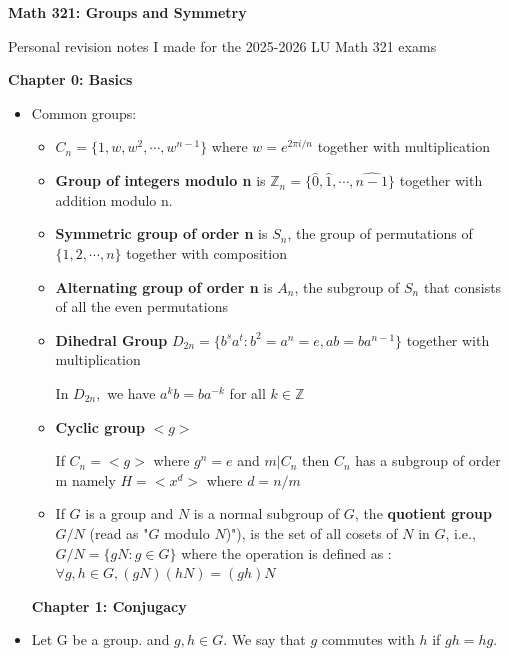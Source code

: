\documentclass[a4paper, 12pt]
{article}
\begin{document}
\textbf{Math 321: Groups and Symmetry}

\hfill

Personal revision notes I made for the 2025-2026 LU Math 321 exams
	
	\hfill
	
\textbf{Chapter 0: Basics}
	\begin{itemize}
		\item Common groups:
		\begin{itemize}
		\item $C_n = \{1,w,w^2, \cdots 
		, w^{n-1}\}$ where $w = e^{2\pi i/n}$ together with multiplication
		
		\item \textbf{Group of integers modulo n} is  $\mathbb{Z}_n = \{\hat{0}, \hat{1}, \cdots, \hat{n-1}\}$ together with addition modulo n.
		
		\item  \textbf{Symmetric group of order n} is $S_n$, the group of permutations of $\{1,2, \cdots, n\}$ together with composition
		
		\item\textbf{ Alternating group of order n} is  $A_n$, the subgroup of $S_n$ that consists of all the even permutations
		
		\item \textbf{Dihedral Group }$D_{2n}= \{b^sa^t: b^2= a^n=e,  ab=ba^{n-1}\}$ together with multiplication
		
		In $D_{2n},$ we have $a^kb= ba^{-k}$ for all $k \in \mathbb{Z}$
		
		\item \textbf{Cyclic group} $<g>$
		
		If $C_n = <g>$ where $g^n = e$ and $m |C_n$ then $C_n$ has a subgroup of order m namely $H= <x^d>$ where $d = n/m$
 		
		\item If $G$ is a group and $N$ is a normal subgroup of $G$, the \textbf{quotient group} $G/N$ (read as "$G$ modulo $N$)"), is the set of all cosets of $N$ in $G$, i.e., $G/N = \{gN: g \in G\}$ where the operation is defined as : $\forall g,h \in G, (gN)(hN) = (gh)N$
		
		\end{itemize}
		
		
		\hfill
		
\textbf{Chapter 1: Conjugacy}

		\item Let G be a group. and $g,h \in G.$ We say that $g$ commutes with $h$ if $gh=hg.$
		

\end{itemize}
\end{document}

